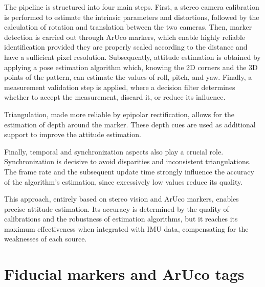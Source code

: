 The pipeline is structured into four main steps. First, a stereo camera calibration is performed to estimate the intrinsic parameters and distortions, followed by the calculation of rotation and translation between the two cameras. Then, marker detection is carried out through ArUco markers, which enable highly reliable identification provided they are properly scaled according to the distance and have a sufficient pixel resolution. Subsequently, attitude estimation is obtained by applying a pose estimation algorithm which, knowing the 2D corners and the 3D points of the pattern, can estimate the values of roll, pitch, and yaw. Finally, a measurement validation step is applied, where a decision filter determines whether to accept the measurement, discard it, or reduce its influence.

Triangulation, made more reliable by epipolar rectification, allows for the estimation of depth around the marker. 
These depth cues are used as additional support to improve the attitude estimation.

Finally, temporal and synchronization aspects also play a crucial role. 
Synchronization is decisive to avoid disparities and inconsistent triangulations. 
The frame rate and the subsequent update time strongly influence the accuracy of the algorithm’s estimation, 
since excessively low values reduce its quality.

This approach, entirely based on stereo vision and ArUco markers, enables precise attitude estimation. 
Its accuracy is determined by the quality of calibrations and the robustness of estimation algorithms, 
but it reaches its maximum effectiveness when integrated with IMU data, 
compensating for the weaknesses of each source.

\section{Fiducial markers and ArUco tags}

